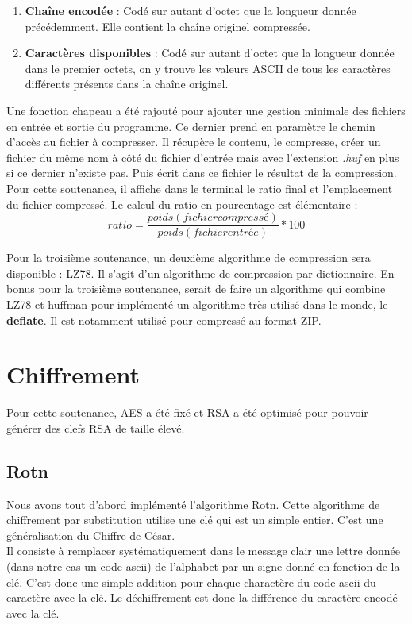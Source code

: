 \begin{itemize}
\begin{enumerate}
                    \item \textbf{Chaîne encodée} : Codé sur autant d'octet que la longueur donnée précédemment. Elle contient la chaîne originel compressée.
                    \item \textbf{Caractères disponibles} : Codé sur autant d'octet que la longueur donnée dans le premier octets, on y trouve les valeurs ASCII de tous les caractères différents présents dans la chaîne originel.
                \end{enumerate}
        \end{itemize}
        
        Une fonction chapeau a été rajouté pour ajouter une gestion minimale des fichiers en entrée et sortie du programme. Ce dernier prend en paramètre le chemin d'accès au fichier à compresser. Il récupère le contenu, le compresse, créer un fichier du même nom à côté du fichier d'entrée mais avec l'extension \textit{.huf} en plus si ce dernier n'existe pas. Puis écrit dans ce fichier le résultat de la compression. Pour cette soutenance, il affiche dans le terminal le ratio final et l'emplacement du fichier compressé.
        Le calcul du ratio en pourcentage est élémentaire :
        \[
            ratio = \frac{poids(fichier compressé)}{poids(fichier entrée)} * 100
        \]
        
        Pour la troisième soutenance, un deuxième algorithme de compression sera disponible : LZ78. Il s'agit d'un algorithme de compression par dictionnaire.
        En bonus pour la troisième soutenance, serait de faire un algorithme qui combine LZ78 et huffman pour implémenté un algorithme très utilisé dans le monde, le \textbf{deflate}. Il est notamment utilisé pour compressé au format ZIP.
        
    
\newpage

\section{Chiffrement}
    
        Pour cette soutenance, AES a été fixé et RSA a été optimisé pour pouvoir générer des clefs RSA de taille élevé.

        \subsection{Rotn}
        Nous avons tout d’abord implémenté l’algorithme Rotn.
        Cette algorithme de chiffrement par substitution utilise une clé qui est un simple entier.
        C’est une généralisation du Chiffre de César. \\
        Il consiste à remplacer systématiquement dans le message clair une lettre donnée (dans notre cas un code ascii) de l'alphabet par un signe donné en fonction de la clé. C’est donc une simple addition pour chaque charactère du code ascii du caractère avec la clé.
        Le déchiffrement est donc la différence du caractère encodé avec la clé. \\ \\

